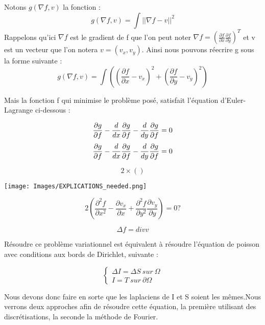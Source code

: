 \documentclass[10pt,a4paper]{article}
\begin{document}
Notons $g(\nabla f, v)$ la fonction  : 
$$g(\nabla f, v) =\int ||\nabla f-v ||^2$$ 
\newline
Rappelons qu'ici $\nabla f$ est le gradient de f que l'on peut noter $\nabla f = (\frac{\partial f}{\partial x} \frac{\partial f}{\partial y})^T$ et v est un vecteur que l'on notera $v = (v_x, v_y)$. 
Ainsi nous pouvons réecrire g sous la forme suivante : 
$$g(\nabla f, v) =\int( (\frac{\partial f}{\partial x}-v_x)^2+(\frac{\partial f}{\partial y}-v_y)^2) $$\newline

Mais la fonction f qui minimise le problème posé,  satisfait l'équation d'Euler-Lagrange ci-dessous : 

\begin{equation*}
    \frac{\partial g}{\partial f}-\frac{d}{dx}\frac{\partial g}{\partial f   }-\frac{d}{dy}\frac{\partial g}{\partial f}= 0 \\
\end{equation*}
\begin{equation*}
    \frac{\partial g}{\partial f}-\frac{d}{dx}\frac{\partial g}{\partial f}-\frac{d}{dy}\frac{\partial g}{\partial f}= 0 \\
\end{equation*}

\begin{equation*}
    2\times()
\end{equation*}

\begin{center}
    \texttt{[image: Images/EXPLICATIONS\_needed.png]}
\end{center}

\begin{equation*}
    2(\frac{\partial^2 f}{\partial x^2}-\frac{\partial v_x}{\partial x}+\frac{\partial^2 f}{\partial y^2}\frac{\partial v_y}{\partial y}) = 0 ?
\end{equation*}

\begin{equation}
    \Delta f = div v
\end{equation}



Résoudre ce problème variationnel est équivalent à résoudre l'équation de poisson avec conditions aux bords de Dirichlet, suivante :
\begin{center}
    \begin{equation*}
        \left\{
        \begin{aligned}
         \Delta I = \Delta S  \ sur \  \Omega \\
          I = T \ sur \  \partial \Omega
        \end{aligned}
        \right.
    \end{equation*}
\end{center}

Nous devons donc faire en sorte que les laplaciens de I et S soient les mêmes.Nous verrons deux approches afin de résoudre cette équation, la première utilisant des discrétisations, la seconde la méthode de Fourier. 
\end{document}
